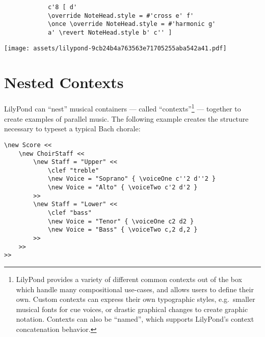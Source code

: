 \documentclass[a4paper]{tufte-handout}
\newenvironment{abjadbookoutput}{}{}
\begin{document}
\begin{description}
\begin{multicols}{2}
            \begin{verbatim}
            c'8 [ d'
            \override NoteHead.style = #'cross e' f'
            \once \override NoteHead.style = #'harmonic g'
            a' \revert NoteHead.style b' c'' ]
            \end{verbatim}

            \begin{comment}
            <lilypond>[stylesheet=stylesheet-minimal.ily]
            \new Staff {
                c'8 [ d'
                \override NoteHead.style = #'cross e' f'
                \once \override NoteHead.style = #'harmonic g'
                a' \revert NoteHead.style b' c'' ]
            }
            </lilypond>
            \end{comment}

            \begin{abjadbookoutput}
            \noindent\texttt{[image: assets/lilypond-9cb24b4a763563e71705255aba542a41.pdf]}
            \end{abjadbookoutput}

        \end{multicols}

\end{description}

\hrulefill{}

\section{Nested Contexts}

LilyPond can \enquote{nest} musical containers --- called
\enquote{contexts}\footnote{%
LilyPond provides a variety of different common
contexts out of the box which handle many compositional use-cases, and allows
users to define their own. Custom contexts can express their own typographic
styles, e.g.\ smaller musical fonts for cue voices, or drastic graphical
changes to create graphic notation. Contexts can also be \enquote{named}, which
supports LilyPond's context concatenation behavior. } --- together to create
examples of parallel music. The following example creates the structure
necessary to typeset a typical Bach chorale:

\begin{verbatim}
\new Score <<
    \new ChoirStaff <<
        \new Staff = "Upper" <<
            \clef "treble"
            \new Voice = "Soprano" { \voiceOne c''2 d''2 }
            \new Voice = "Alto" { \voiceTwo c'2 d'2 }
        >>
        \new Staff = "Lower" <<
            \clef "bass"
            \new Voice = "Tenor" { \voiceOne c2 d2 }
            \new Voice = "Bass" { \voiceTwo c,2 d,2 }
        >>
    >>
>>
\end{verbatim}
\end{document}
